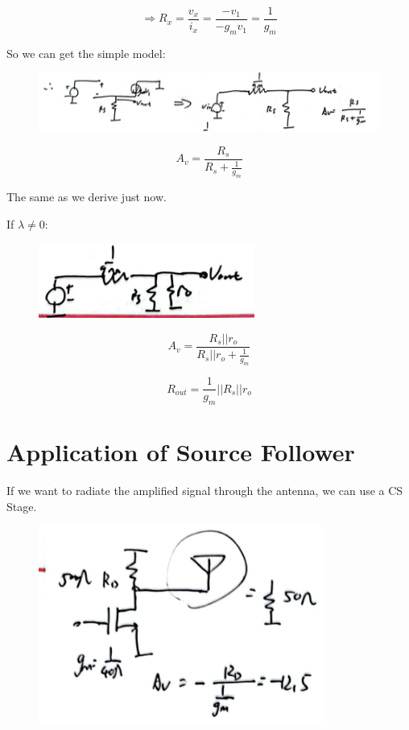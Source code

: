 \documentclass[fontset=windows]{article}
\begin{document}
$$\Longrightarrow R_x=\frac{v_x}{i_x}=\frac{-v_1}{-g_mv_1}=\frac{1}{g_m}$$

So we can get the simple model: 

\begin{figure}[htbp]
    \centering
    \includegraphics[scale=0.8]{5.jpg}
    \captionsetup{labelformat=empty}
    \caption{}
    \label{5}
\end{figure}

$$A_v=\frac{R_s}{R_s+\frac{1}{g_m}}$$

The same as we derive just now. 

If $\lambda \neq 0$: 

\begin{figure}[htbp]
    \centering
    \includegraphics[scale=0.8]{6.jpg}
    \captionsetup{labelformat=empty}
    \caption{}
    \label{6}
\end{figure}

$$A_v=\frac{R_s||r_o}{R_s||r_o+\frac{1}{g_m}}$$

$$R_{out}=\frac{1}{g_m}||R_s||r_o$$

\section*{Application of Source Follower}

If we want to radiate the amplified signal through the antenna, we can use a CS Stage. 

\begin{figure}[htbp]
    \centering
    \includegraphics[scale=0.8]{7.jpg}
    \captionsetup{labelformat=empty}
    \caption{}
    \label{7}
\end{figure}
\end{document}
